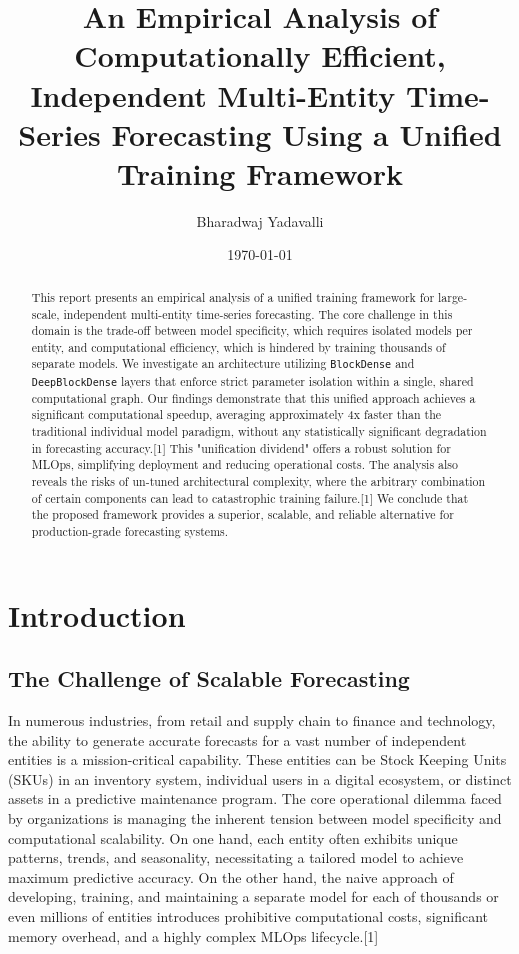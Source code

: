 \documentclass{article}
\title{An Empirical Analysis of Computationally Efficient, Independent Multi-Entity Time-Series Forecasting Using a Unified Training Framework}
\author{Bharadwaj Yadavalli}
\date{\today}
\begin{document}
\maketitle

\begin{abstract}
This report presents an empirical analysis of a unified training framework for large-scale, independent multi-entity time-series forecasting. The core challenge in this domain is the trade-off between model specificity, which requires isolated models per entity, and computational efficiency, which is hindered by training thousands of separate models. We investigate an architecture utilizing \texttt{BlockDense} and \texttt{DeepBlockDense} layers that enforce strict parameter isolation within a single, shared computational graph. Our findings demonstrate that this unified approach achieves a significant computational speedup, averaging approximately 4x faster than the traditional individual model paradigm, without any statistically significant degradation in forecasting accuracy.[1] This "unification dividend" offers a robust solution for MLOps, simplifying deployment and reducing operational costs. The analysis also reveals the risks of un-tuned architectural complexity, where the arbitrary combination of certain components can lead to catastrophic training failure.[1] We conclude that the proposed framework provides a superior, scalable, and reliable alternative for production-grade forecasting systems.
\end{abstract}

\section{Introduction}

\subsection{The Challenge of Scalable Forecasting}

In numerous industries, from retail and supply chain to finance and technology, the ability to generate accurate forecasts for a vast number of independent entities is a mission-critical capability. These entities can be Stock Keeping Units (SKUs) in an inventory system, individual users in a digital ecosystem, or distinct assets in a predictive maintenance program. The core operational dilemma faced by organizations is managing the inherent tension between model specificity and computational scalability. On one hand, each entity often exhibits unique patterns, trends, and seasonality, necessitating a tailored model to achieve maximum predictive accuracy. On the other hand, the naive approach of developing, training, and maintaining a separate model for each of thousands or even millions of entities introduces prohibitive computational costs, significant memory overhead, and a highly complex MLOps lifecycle.[1]
\end{document}
